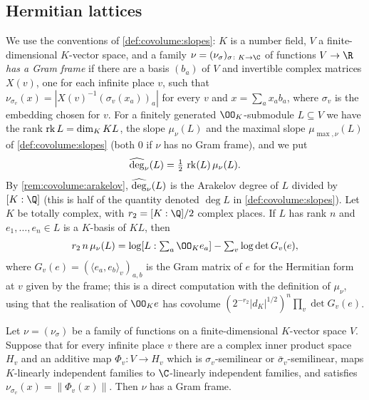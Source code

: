 \subsection{Hermitian lattices}\label{sec:pf:lift2:lattices}

We use the conventions of \cref{def:covolume:slopes}: $K$ is a number field, $V$ a finite-dimensional
$K$-vector space, and a family $\nu=(\nu_\sigma)_{\sigma\colon K\to\C}$ of functions $V\to\R$ \emph{has a Gram
frame} if there are a basis $(b_a)$ of $V$ and invertible complex matrices $X(v)$, one for each infinite place
$v$, such that $\nu_{\sigma_v}(x)=|X(v)^{-1}(\sigma_v(x_a))_a|$ for every $v$ and $x=\sum_ax_ab_a$, where
$\sigma_v$ is the embedding chosen for $v$. For a finitely generated $\OO_K$-submodule $L\subseteq V$ we have
the rank $\operatorname{rk} L=\dim_KKL$, the slope $\mu_\nu(L)$ and the maximal slope $\mu_{\max,\nu}(L)$ of
\cref{def:covolume:slopes} (both $0$ if $\nu$ has no Gram frame), and we put
\begin{equation}\label{eq:pf:lift2:deg}
\widehat{\operatorname{deg}}_\nu(L)=\tfrac12\,\operatorname{rk}(L)\,\mu_\nu(L).
\end{equation}
By \cref{rem:covolume:arakelov}, $\widehat{\operatorname{deg}}_\nu(L)$ is the Arakelov degree of $L$ divided by $[K:\Q]$
(this is half of the quantity denoted $\deg L$ in \cref{def:covolume:slopes}). Let $K$ be totally complex,
with $r_2=[K:\Q]/2$ complex places. If $L$ has rank $n$ and $e_1,\dots,e_n\in L$ is a $K$-basis of $KL$, then
\begin{equation}\label{eq:pf:lift2:gram}
r_2\,n\,\mu_\nu(L)=\log[L:\textstyle\sum_a\OO_Ke_a]-\sum_v\log\det G_v(e),
\end{equation}
where $G_v(e)=(\langle e_a,e_b\rangle_v)_{a,b}$ is the Gram matrix of $e$ for the Hermitian form at $v$ given by
the frame; this is a direct computation with the definition of $\mu_\nu$, using that the realisation of
$\OO_Ke$ has covolume $(2^{-r_2}|d_K|^{1/2})^n\prod_v\det G_v(e)$.

\begin{lemma}\label{pf:lift2:hasgram}
Let $\nu=(\nu_\sigma)$ be a family of functions on a finite-dimensional $K$-vector space $V$. Suppose that for
every infinite place $v$ there are a complex inner product space $H_v$ and an additive map $\Phi_v\colon V\to
H_v$ which is $\sigma_v$-semilinear or $\bar\sigma_v$-semilinear, maps $K$-linearly independent families to
$\C$-linearly independent families, and satisfies $\nu_{\sigma_v}(x)=\|\Phi_v(x)\|$. Then $\nu$ has a Gram
frame.
\end{lemma}

